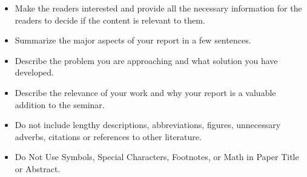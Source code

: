 \begin{itemize}
	\item Make the readers interested and provide all the necessary information for the readers to decide if the content is relevant to them.
	\item Summarize the major aspects of your report in a few sentences.
	\item Describe the problem you are approaching and what solution you have developed.
	\item Describe the relevance of your work and why your report is a valuable addition to the seminar.
	\item Do not include lengthy descriptions, abbreviations, figures, unnecessary adverbs, citations or references to other literature.
	\item Do Not Use Symbols, Special Characters, Footnotes, or Math in Paper Title or Abstract.
\end{itemize}